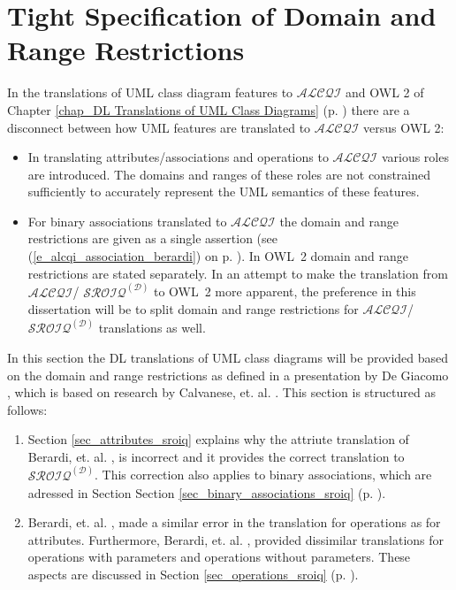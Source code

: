\section{Tight Specification of Domain and Range Restrictions}  
\label{sec_DL Translation in terms of Domain and Range Restrictions}
In the translations of UML class diagram features to $\mathcal{ALCQI}$ and 
OWL 2 of Chapter \ref{chap_DL Translations of UML Class Diagrams} 
(p. \pageref{chap_DL Translations of UML Class Diagrams}) there
are a disconnect between how UML features are translated to $\mathcal{ALCQI}$ versus OWL 2:
\begin{itemize}
 \item In translating attributes/associations and operations to $\mathcal{ALCQI}$ various roles are introduced.
 The domains and ranges of these roles are not constrained sufficiently to accurately represent
 the UML semantics of these features. 
 \item For binary associations translated to $\mathcal{ALCQI}$ the domain and range restrictions are 
 given as a single assertion (see (\ref{e_alcqi_association_berardi}) on 
 p. \pageref{e_alcqi_association_berardi}). In OWL~2 domain and range restrictions
 are stated separately. In an attempt to make the translation from $\mathcal{ALCQI}$/
 $\mathcal{SROIQ}^{(\mathcal{D})}$ to OWL~2 more apparent, the preference in this dissertation
 will be to split domain and range restrictions for $\mathcal{ALCQI}$/
 $\mathcal{SROIQ}^{(\mathcal{D})}$ translations as well.
\end{itemize}

In this section the DL translations of UML class diagrams will be provided based on 
the domain and range restrictions as defined in a presentation by 
De Giacomo \cite{DeGiacomoPresentation}, which is based on research by Calvanese, 
et. al. \cite{Calvanese2009}. This section is structured as follows:
\begin{enumerate}
 \item Section \ref{sec_attributes_sroiq} explains why the attriute translation of 
 Berardi, et. al. \cite{Berardi2005},
 is incorrect and it provides the correct translation to $\mathcal{SROIQ}^{(\mathcal{D})}$.
 This correction also applies to binary associations, which are adressed in Section
 Section \ref{sec_binary_associations_sroiq} (p. \pageref{sec_binary_associations_sroiq}).
 \item Berardi, et. al. \cite{Berardi2005}, made a similar error in the translation for operations
 as for attributes. Furthermore, Berardi, et. al. \cite{Berardi2005}, provided dissimilar 
 translations for operations with parameters and operations without parameters.
 These aspects are discussed in Section \ref{sec_operations_sroiq} 
 (p. \pageref{sec_operations_sroiq}).
\end{enumerate}




